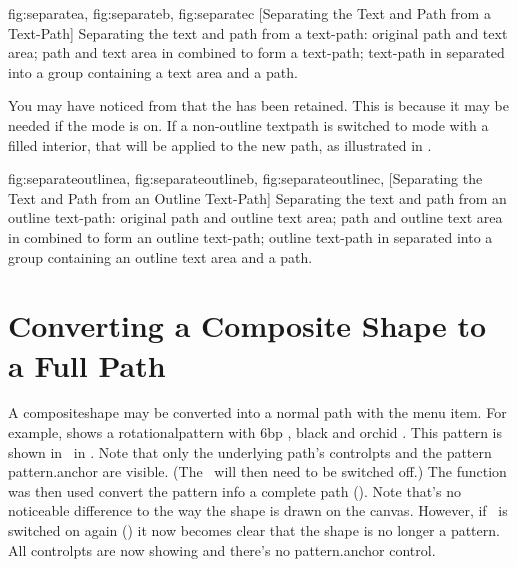 {
  {fig:separatea}{}{},
  {fig:separateb}{}{},
  {fig:separatec}{}{}
}
[Separating the Text and Path from a Text-Path]
{Separating the text and path from a text-path: 
 original path and text area;
 path and text area 
in  combined to form a text-path;
 text-path 
in  separated into
a group containing a text area and a path.}

You may have noticed from  that the 
 has been retained. This is because it may be needed if the
 mode is on.  If a non-outline \gls{textpath} is switched to
 mode with a filled interior, that  will be applied
to the new \gls{path}, as illustrated in .

{
  {fig:separateoutlinea}{}{},
  {fig:separateoutlineb}{}{},
  {fig:separateoutlinec}{}{},
}
[Separating the Text and Path from an Outline Text-Path]
{Separating the text and path from an outline text-path: 
 original path and
outline text area;
 path and outline text area 
in  combined to
form an outline text-path;
 outline text-path in 
 separated into
a group containing an outline text area and a path.}


\section{Converting a Composite Shape to a Full Path}\label{sec:converttofullpath}


A \gls{compositeshape} may be converted into a normal path with the
 menu item.  For example,
 shows a
\gls{rotationalpattern} with 6\gls{bp} , black
 and orchid .  This
pattern is shown in \editpathmode\ in
. Note that only the
underlying path's \glspl{controlpt} and the pattern
\gls{pattern.anchor} are visible. (The \editpathmode\ will then need
to be switched off.) The  function was
then used convert the \gls{pattern} info a complete \gls{path}
().  Note that's no
noticeable difference to the way the \gls{shape} is drawn on the
\gls{canvas}. However, if \editpathmode\ is switched on again
() it now becomes clear
that the shape is no longer a \gls{pattern}. All \glspl{controlpt}
are now showing and there's no \gls{pattern.anchor} control.

